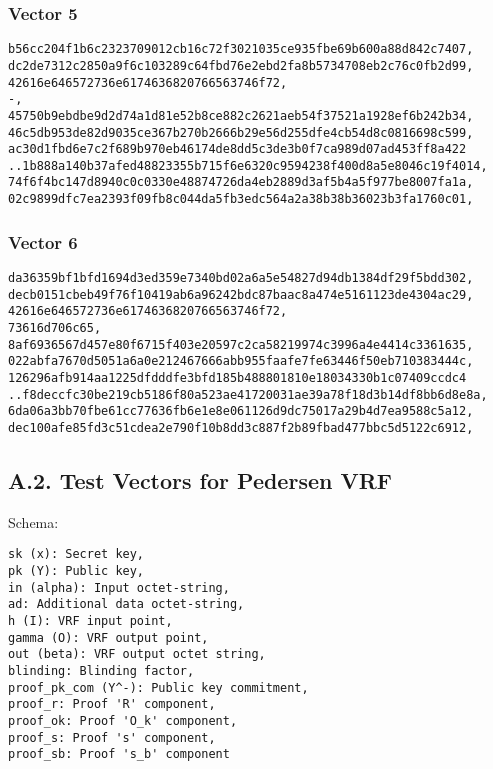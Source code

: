 \documentclass[
]{article}
\begin{document}
\hypertarget{vector-5}{%
\subsubsection{Vector 5}\label{vector-5}}

\begin{verbatim}
b56cc204f1b6c2323709012cb16c72f3021035ce935fbe69b600a88d842c7407,
dc2de7312c2850a9f6c103289c64fbd76e2ebd2fa8b5734708eb2c76c0fb2d99,
42616e646572736e6174636820766563746f72,
-,
45750b9ebdbe9d2d74a1d81e52b8ce882c2621aeb54f37521a1928ef6b242b34,
46c5db953de82d9035ce367b270b2666b29e56d255dfe4cb54d8c0816698c599,
ac30d1fbd6e7c2f689b970eb46174de8dd5c3de3b0f7ca989d07ad453ff8a422
..1b888a140b37afed48823355b715f6e6320c9594238f400d8a5e8046c19f4014,
74f6f4bc147d8940c0c0330e48874726da4eb2889d3af5b4a5f977be8007fa1a,
02c9899dfc7ea2393f09fb8c044da5fb3edc564a2a38b38b36023b3fa1760c01,
\end{verbatim}

\hypertarget{vector-6}{%
\subsubsection{Vector 6}\label{vector-6}}

\begin{verbatim}
da36359bf1bfd1694d3ed359e7340bd02a6a5e54827d94db1384df29f5bdd302,
decb0151cbeb49f76f10419ab6a96242bdc87baac8a474e5161123de4304ac29,
42616e646572736e6174636820766563746f72,
73616d706c65,
8af6936567d457e80f6715f403e20597c2ca58219974c3996a4e4414c3361635,
022abfa7670d5051a6a0e212467666abb955faafe7fe63446f50eb710383444c,
126296afb914aa1225dfdddfe3bfd185b488801810e18034330b1c07409ccdc4
..f8deccfc30be219cb5186f80a523ae41720031ae39a78f18d3b14df8bb6d8e8a,
6da06a3bb70fbe61cc77636fb6e1e8e061126d9dc75017a29b4d7ea9588c5a12,
dec100afe85fd3c51cdea2e790f10b8dd3c887f2b89fbad477bbc5d5122c6912,
\end{verbatim}

\hypertarget{a.2.-test-vectors-for-pedersen-vrf}{%
\subsection{A.2. Test Vectors for Pedersen
VRF}\label{a.2.-test-vectors-for-pedersen-vrf}}

Schema:

\begin{verbatim}
sk (x): Secret key,
pk (Y): Public key,
in (alpha): Input octet-string,
ad: Additional data octet-string,
h (I): VRF input point,
gamma (O): VRF output point,
out (beta): VRF output octet string,
blinding: Blinding factor,
proof_pk_com (Y^-): Public key commitment,
proof_r: Proof 'R' component,
proof_ok: Proof 'O_k' component,
proof_s: Proof 's' component,
proof_sb: Proof 's_b' component
\end{verbatim}
\end{document}
